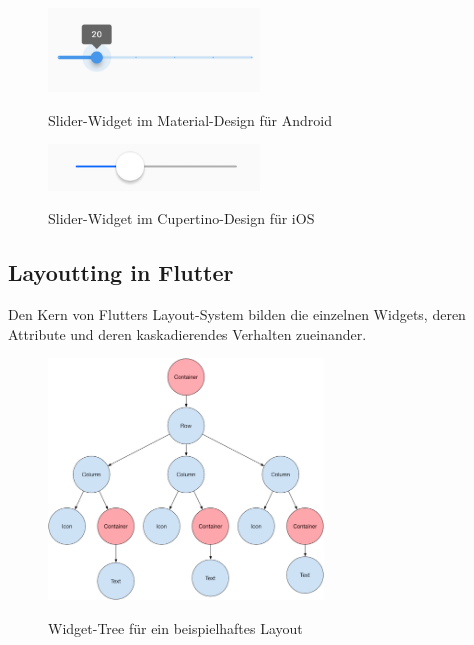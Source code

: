 \begin{figure}[H]
    \begin{center}
        \includegraphics[width=0.5\textwidth]{images/Flutter/material-slider.png}
        \caption{Slider-Widget im Material-Design für Android}
        \cite{flutterMaterialSlider}
    \end{center}
\end{figure}

\begin{figure}[H]
    \begin{center}
        \includegraphics[width=0.5\textwidth]{images/Flutter/cupertino-slider.png}
        \caption{Slider-Widget im Cupertino-Design für iOS}
        \cite{flutterCupertinoSlider}
    \end{center}
\end{figure}

\subsection{Layoutting in Flutter}

Den Kern von Flutters Layout-System bilden die einzelnen Widgets, deren Attribute und deren
kaskadierendes Verhalten zueinander.

\begin{figure}[H]
    \begin{center}
        \includegraphics[width=0.65\textwidth]{images/Flutter/widget-tree.png}
        \caption{Widget-Tree für ein beispielhaftes Layout}
        \cite{flutterWidgetTree}
    \end{center}
\end{figure}

